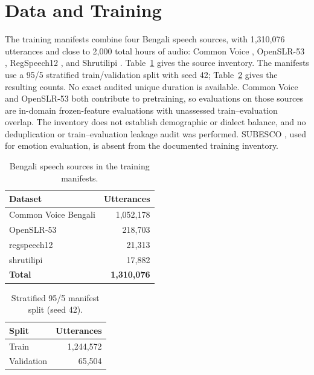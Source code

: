 \documentclass[11pt,a4paper]{article}
\begin{document}
\section{Data and Training}

The training manifests combine four Bengali speech sources, with 1,310,076 utterances and close to 2,000 total hours of audio: Common Voice \citep{ardila2020commonvoice}, OpenSLR-53 \citep{kjartansson2018crowdsourced}, RegSpeech12 \citep{hassan2025regspeech12}, and Shrutilipi \citep{bhogale2023shrutilipi}. Table~\ref{tab:training-data} gives the source inventory. The manifests use a 95/5 stratified train/validation split with seed 42; Table~\ref{tab:training-split} gives the resulting counts. No exact audited unique duration is available. Common Voice and OpenSLR-53 both contribute to pretraining, so evaluations on those sources are in-domain frozen-feature evaluations with unassessed train--evaluation overlap. The inventory does not establish demographic or dialect balance, and no deduplication or train--evaluation leakage audit was performed. SUBESCO \citep{sultana2021subesco}, used for emotion evaluation, is absent from the documented training inventory.

\begin{table}[t]
\centering
\small
\begin{tabular}{@{}lr@{}}
\toprule
Dataset & Utterances \\
\midrule
Common Voice Bengali & 1,052,178 \\
OpenSLR-53 & 218,703 \\
regspeech12 & 21,313 \\
shrutilipi & 17,882 \\
\midrule
\textbf{Total} & \textbf{1,310,076} \\
\bottomrule
\end{tabular}
\caption{Bengali speech sources in the training manifests.}
\label{tab:training-data}
\end{table}

\begin{table}[t]
\centering
\small
\begin{tabular}{@{}lr@{}}
\toprule
Split & Utterances \\
\midrule
Train & 1,244,572 \\
Validation & 65,504 \\
\bottomrule
\end{tabular}
\caption{Stratified 95/5 manifest split (seed 42).}
\label{tab:training-split}
\end{table}
\end{document}

